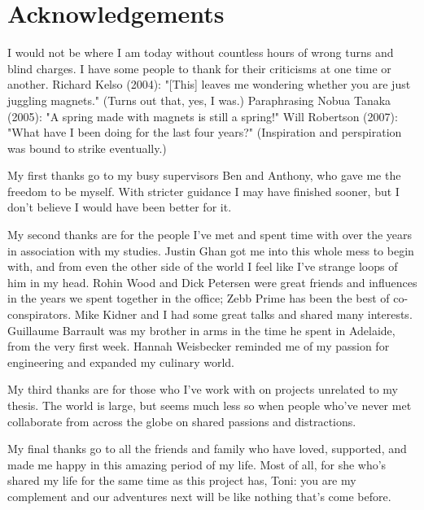 
\section{Acknowledgements}

I would not be where I am today without countless hours of wrong turns and
blind charges.
I have some people to thank for their criticisms at one time or another. 
Richard Kelso (2004): "[This] leaves me wondering whether you are just juggling magnets." (Turns out that, yes, I was.)
Paraphrasing Nobua Tanaka (2005): "A spring made with magnets is still a spring!"
Will Robertson (2007): "What have I been doing for the last four years?"
(Inspiration and perspiration was bound to strike eventually.)

My first thanks go to my busy supervisors Ben and Anthony, who gave me the freedom to be myself.
With stricter guidance I may have finished sooner, but I don't believe I would have been better for it.

My second thanks are for the people I've met and spent time with over the years in association with my studies.
Justin Ghan got me into this whole mess to begin with, and from even the other side of the world I feel like I've strange loops of him in my head.
Rohin Wood and Dick Petersen were great friends and influences in the years we spent together in the office; Zebb Prime has been the best of co-conspirators. Mike Kidner and I had some great talks and shared many interests.
Guillaume Barrault was my brother in arms in the time he spent in Adelaide, from the very first week.
Hannah Weisbecker reminded me of my passion for engineering and expanded my culinary world.

My third thanks are for those who I've work with on projects unrelated to my thesis.
The world is large, but seems much less so when people who've never met collaborate from across the globe on shared passions and distractions.

My final thanks go to all the friends and family who have loved, supported,
and made me happy in this amazing period of my life.
Most of all, for she who's shared my life for the same time as this project has, Toni: you are my complement and our adventures next will be like nothing that's come before.
